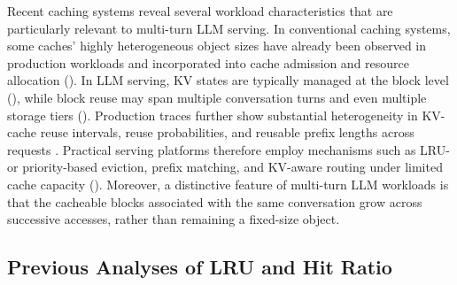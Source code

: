 \documentclass{article}
\theoremstyle{definition}
\begin{document}



Recent caching systems reveal several workload characteristics that are particularly relevant to multi-turn LLM serving. In conventional caching systems, some caches' highly heterogeneous object sizes have already been observed in production workloads and incorporated into cache admission and resource allocation (\cite{berger2017adaptsize,berger2018robinhood,berg2020cachelib}). In LLM serving, KV states are typically managed at the block level (\cite{kwon2023pagedattention}), while block reuse may span multiple conversation turns and even multiple storage tiers (\cite{deepseek2024contextcache,gao2024cachedattention,qin2025mooncake}). Production traces further show substantial heterogeneity in KV-cache reuse intervals, reuse probabilities, and reusable prefix lengths across requests \cite{wang2025kvcache}. Practical serving platforms therefore employ mechanisms such as LRU- or priority-based eviction, prefix matching, and KV-aware routing under limited cache capacity (\cite{nvidia2025kvcachereuse}). Moreover, a distinctive feature of multi-turn LLM workloads is that the cacheable blocks associated with the same conversation grow across successive accesses, rather than remaining a fixed-size object.

\subsection{Previous Analyses of LRU and Hit Ratio}
\label{ssec: Previous Analyses of LRU and Hit Ratio}
    
\end{document}
